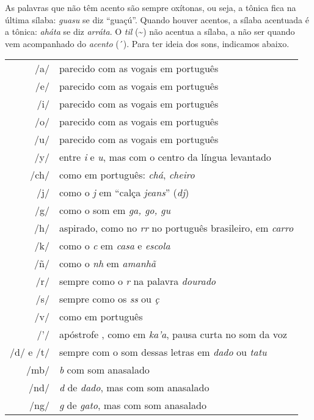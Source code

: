 As palavras que não têm acento são sempre oxítonas, ou seja, a tônica
fica na última sílaba: \textit{guasu} se diz ``guaçú''. Quando houver
acentos, a sílaba acentuada é a tônica: \textit{aháta} se diz
\textit{arráta}. O \textit{til} (\textasciitilde{}) não acentua a sílaba, a não ser
quando vem acompanhado do \textit{acento} (´). Para ter ideia dos sons, indicamos abaixo.

\bigskip

\begingroup
\begin{tabular}{rl}
/a/ & parecido com as vogais em português\\
/e/ & parecido com as vogais em português\\
/i/ & parecido com as vogais em português\\
/o/ & parecido com as vogais em português\\
/u/ & parecido com as vogais em português\\
/y/ & entre \textit{i} e \textit{u}, mas com o centro da língua levantado\\
/ch/ & como em português: \textit{chá}, \textit{cheiro}\\
/j/ & como o \textit{j} em ``calça \textit{jeans}'' (\textit{dj})\\
/g/ & como o som em \textit{ga, go, gu }\\
/h/ & aspirado, como no \textit{rr} no português brasileiro, em \textit{carro}\\
/k/ & como o \textit{c} em \textit{casa} e \textit{escola}\\
/ñ/ & como o \textit{nh} em \textit{amanhã}\\
/r/ & sempre como o \textit{r} na palavra \textit{dourado}\\
/s/ & sempre como os \textit{ss} ou \textit{ç}\\
/v/ & como em português\\
/'/ & apóstrofe , como em \textit{ka'a}, pausa curta no som da voz\\
/d/ e /t/ & sempre com o som dessas letras em \textit{dado} ou \textit{tatu}\\
/mb/ & \textit{b} com som anasalado\\
/nd/ & \textit{d} de \textit{dado}, mas com som anasalado\\
/ng/ & \textit{g} de \textit{gato}, mas com som anasalado
\end{tabular}
\endgroup





